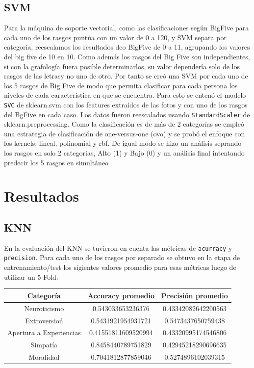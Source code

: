 \documentclass[10pt, a4paper]{article}
\begin{document}
        \subsection{SVM}
            Para la m\'aquina de soporte vectorial, como las clasificaciones seg\'un BigFive para cada uno de los rasgos punt\'ua con un valor de 0 a 120, y SVM separa por categor\'ia,
            reescalamos los resultados deo BigFive de 0 a 11, agrupando los valores del big five de 10 en 10. Como adem\'as los rasgos del Big Five son independientes, si con la grafolog\'ia fuera posible determinarlos, su valor depender\'ia solo de los rasgos de las letrasy no uno de otro.
            Por tanto se cre\'o una SVM por cada uno de los 5 rasgos de Big Five de modo que permita clasificar para cada persona los niveles de cada caracter\'istica en que se encuentra. Para esto se enten\'o el modelo \texttt{SVC} de sklearn.svm con los features extra\'idos de las fotos y con uno de los rasgos del BgFive en cada caso.
            Los datos fueron reescalados usando \texttt{StandardScaler} de sklearn.preprocessing.
            Como la clasificaci\'on es de m\'as de 2 categor\'ias se emple\'o una estrategia de clasificaci\'on de one-versus-one (ovo) y se prob\'o el enfoque con los kernels: lineal, polinomial y rbf. De igual modo se hizo un an\'alisis seprando los rasgos en solo 2 categorias, Alto (1) y Bajo (0) y un an\'alisis final intentando predecir 
            los 5 rasgos en simult\'aneo

    \section{Resultados}
            \subsection{KNN}
                En la evaluaci\'on del KNN se tuvieron en cuenta las m\'etricas de \texttt{acurracy} y \texttt{precision}. Para cada uno de los rasgos por separado se
                obtuvo en la etapa de entrenamiento/test los sigientes valores promedio para esas m\'etricas luego de utilizar un 5-Fold: \\

                \begin{tabular}[h!]{|c|c|c|}

                    \hline Categor\'ia & Accuracy promedio & Precisi\'on promedio \\  
                    \hline Neuroticismo & 0.543033653236376 & 0.43342082642200563 \\
                    \hline Extroversio\'n& 0.5431921954931721 & 0.5473437650759438 \\
                    \hline Apertura a Experiencias & 0.41551811609520994 & 0.43320995174546806 \\
                    \hline Simpat\'ia& 0.8458440789751829 & 0.42945218290696635 \\
                    \hline Moralidad & 0.7041812877859046 & 0.5274896102039315 \\
                    \hline
                \end{tabular}
\end{document}

